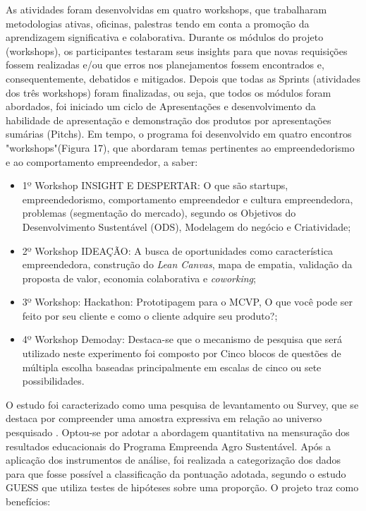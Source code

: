 As atividades foram desenvolvidas em quatro workshops, que trabalharam metodologias ativas, oficinas, palestras tendo em conta a promoção da aprendizagem significativa e colaborativa. Durante os módulos do projeto (workshops), os participantes testaram seus insights para que novas requisições fossem realizadas e/ou que erros nos planejamentos fossem encontrados e, consequentemente, debatidos e mitigados. Depois que todas as Sprints (atividades dos três workshops) foram finalizadas, ou seja, que todos os módulos foram abordados, foi iniciado um ciclo de Apresentações e desenvolvimento da habilidade de apresentação e demonstração dos produtos por apresentações sumárias (Pitchs). Em tempo, o programa foi desenvolvido em quatro encontros "workshops"(Figura 17), que abordaram temas pertinentes ao empreendedorismo e ao comportamento empreendedor, a saber:



\begin{itemize}

\item {1º Workshop INSIGHT E DESPERTAR: O que são startups, empreendedorismo, comportamento empreendedor e cultura empreendedora, problemas (segmentação do mercado), segundo os Objetivos do Desenvolvimento Sustentável (ODS), Modelagem do negócio e Criatividade;}
\item {2º Workshop IDEAÇÃO: A busca de oportunidades como característica empreendedora, construção do \textit{Lean Canvas}, mapa de empatia, validação da proposta de valor, economia colaborativa e \textit{coworking};}

\item {3º Workshop: Hackathon: Prototipagem para o MCVP, O que você pode ser feito por seu cliente e como o cliente adquire seu produto?;}
\item {4º Workshop Demoday: Destaca-se que o mecanismo de pesquisa que será utilizado neste experimento foi composto por Cinco blocos de questões de múltipla escolha baseadas principalmente em escalas de cinco ou sete possibilidades.}
\end{itemize}

O estudo foi caracterizado como uma pesquisa de levantamento ou Survey, que se destaca por compreender uma amostra expressiva em relação ao universo pesquisado \cite{freitas_o_2000}. Optou-se por adotar a abordagem quantitativa na mensuração dos resultados educacionais do Programa Empreenda Agro Sustentável. Após a aplicação dos instrumentos de análise, foi realizada a categorização dos dados para que fosse possível a classificação da pontuação adotada, segundo o estudo GUESS \cite{lima_educacao_2015} que utiliza testes de hipóteses sobre uma proporção. O projeto traz como benefícios: 

